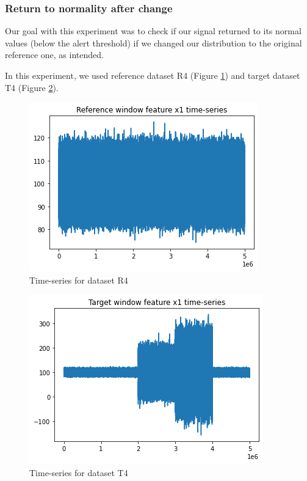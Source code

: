 \newpage

\subsubsection{Return to normality after change}
Our goal with this experiment was to check if our signal returned to its normal values (below the alert threshold) if we changed our distribution to the original reference one, as intended.

In this experiment, we used reference dataset R4 (Figure \ref{fig:timeseries-r4}) and target dataset T4 (Figure \ref{fig:timeseries-t4}). 
\begin{figure}[!htb]
    \begin{center}
      \includegraphics[scale=0.6]{figures/timeseries-r4.png}
      \caption[]{Time-series for dataset R4}
      \label{fig:timeseries-r4}
    \end{center}
\end{figure}
\begin{figure}[!htb]
    \begin{center}
      \includegraphics[scale=0.6]{figures/timeseries-t4.png}
      \caption[]{Time-series for dataset T4}
      \label{fig:timeseries-t4}
    \end{center}
\end{figure}

